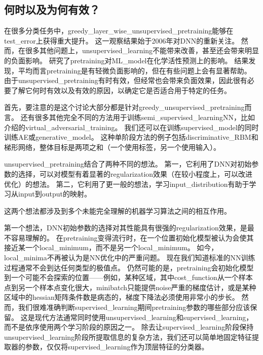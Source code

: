\subsection{何时以及为何有效？}
\label{sec:when_and_why_does_unsupervised_pretraining_work}
在很多分类任务中，\gls{greedy_layer_wise_unsupervised_pretraining}能够在\gls{test_error}上获得重大提升。
这一观察结果始于2006年对\gls{DNN}的重新关注\citep{Hinton06-small,Bengio-nips-2006,ranzato-07-small}。
然而，在很多其他问题上，\gls{unsupervised_learning}不能带来改善，甚至还会带来明显的负面影响。
\cite{Ma-et-al-2015}研究了\gls{pretraining}对\gls{ML_model}在化学活性预测上的影响。
结果发现，平均而言\gls{pretraining}是有轻微负面影响的，但在有些问题上会有显著帮助。
由于\gls{unsupervised_pretraining}有时有效，但经常也会带来负面效果，因此很有必要了解它何时有效以及有效的原因，以确定它是否适合用于特定的任务。


首先，要注意的是这个讨论大部分都是针对\gls{greedy_unsupervised_pretraining}而言。
还有很多其他完全不同的方法用于训练\gls{semi_supervised_learning}\gls{NN}，比如介绍的\gls{virtual_adversarial_training}。
我们还可以在训练\gls{supervised_model}的同时训练\gls{AE}或\gls{generative_model}。
这种单阶段方法的例子包括\gls{discriminative_RBM}\citep{Larochelle+Bengio-2008}和梯形网络\citep{Rasmus-et-al-arxiv2015}，整体目标是两项之和（一个使用标签，另一个使用输入）。


\gls{unsupervised_pretraining}结合了两种不同的想法。
第一，它利用了\gls{DNN}对初始参数的选择，可以对模型有着显著的\gls{regularization}效果（在较小程度上，可以改进优化）的想法。
第二，它利用了更一般的想法，学习\gls{input_distribution}有助于学习从\gls{input}到\gls{output}的映射。


这两个想法都涉及到多个未能完全理解的机器学习算法之间的相互作用。


第一个想法，\gls{DNN}初始参数的选择对其性能具有很强的\gls{regularization}效果，是最不容易理解的。
在\gls{pretraining}变得流行时，在一个位置初始化模型被认为会使其接近某一个\gls{local_minimum}，而不是另一个\gls{local_minimum}。
如今，\gls{local_minima}不再被认为是\gls{NN}优化中的严重问题。
现在我们知道标准的\gls{NN}训练过程通常不会到达任何类型的极值点。
仍然可能的是，\gls{pretraining}会初始化模型到一个可能不会探索的位置——例如，某种区域，其中\gls{cost_function}从一个样本点到另一个样本点变化很大，\gls{minibatch}只能提供\gls{noise}严重的梯度估计，或是某种区域中的\gls{hessian}矩阵条件数是病态的，梯度下降法必须使用非常小的步长。
然而，我们很难准确判断\gls{supervised_learning}期间\gls{pretraining}参数的哪些部分应该保留。
这是现代方法通常同时使用\gls{unsupervised_learning}和\gls{supervised_learning}，而不是依序使用两个学习阶段的原因之一。
除去让\gls{supervised_learning}阶段保持\gls{unsupervised_learning}阶段所提取信息的复杂方法，我们还可以简单地固定特征提取器的参数，仅仅将\gls{supervised_learning}作为顶层特征的分类器。

